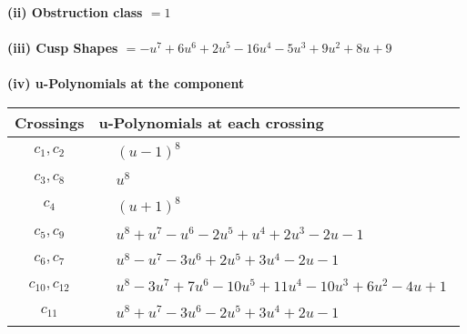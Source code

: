 \documentclass[1p]{elsarticle_modified}
\theoremstyle{definition}
\begin{document}
\flushleft \textbf{(ii) Obstruction class $= 1$}\\~\\
\flushleft \textbf{(iii) Cusp Shapes $= - u^7+6 u^6+2 u^5-16 u^4-5 u^3+9 u^2+8 u+9$}\\~\\
\newpage\renewcommand{\arraystretch}{1}
\flushleft \textbf{(iv) u-Polynomials at the component}\newline \\
\begin{tabular}{m{50pt}|m{274pt}}
Crossings & \hspace{64pt}u-Polynomials at each crossing \\
\hline $$\begin{aligned}c_{1},c_{2}\end{aligned}$$&$\begin{aligned}
&(u-1)^8
\end{aligned}$\\
\hline $$\begin{aligned}c_{3},c_{8}\end{aligned}$$&$\begin{aligned}
&u^8
\end{aligned}$\\
\hline $$\begin{aligned}c_{4}\end{aligned}$$&$\begin{aligned}
&(u+1)^8
\end{aligned}$\\
\hline $$\begin{aligned}c_{5},c_{9}\end{aligned}$$&$\begin{aligned}
&u^8+u^7- u^6-2 u^5+u^4+2 u^3-2 u-1
\end{aligned}$\\
\hline $$\begin{aligned}c_{6},c_{7}\end{aligned}$$&$\begin{aligned}
&u^8- u^7-3 u^6+2 u^5+3 u^4-2 u-1
\end{aligned}$\\
\hline $$\begin{aligned}c_{10},c_{12}\end{aligned}$$&$\begin{aligned}
&u^8-3 u^7+7 u^6-10 u^5+11 u^4-10 u^3+6 u^2-4 u+1
\end{aligned}$\\
\hline $$\begin{aligned}c_{11}\end{aligned}$$&$\begin{aligned}
&u^8+u^7-3 u^6-2 u^5+3 u^4+2 u-1
\end{aligned}$\\
\hline
\end{tabular}\\~\\
\end{document}
